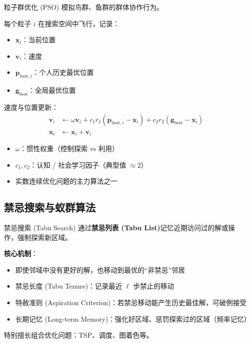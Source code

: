 \documentclass[11pt, aspectratio=169, svgnames, table, fontset=fandol]{ctexbeamer}
\begin{document}
\begin{frame}{粒子群优化 (PSO)}
  模拟鸟群、鱼群的群体协作行为。

  \vspace{4pt}
  每个粒子 $i$ 在搜索空间中飞行，记录：
  \begin{itemize}
    \item $\bm{x}_i$：当前位置
    \item $\bm{v}_i$：速度
    \item $\bm{p}_{\text{best},i}$：个人历史最优位置
    \item $\bm{g}_{\text{best}}$：全局最优位置
  \end{itemize}

  \vspace{4pt}
  速度与位置更新：
  \begin{align*}
    \bm{v}_i &\leftarrow \omega \bm{v}_i + c_1 r_1 (\bm{p}_{\text{best},i} - \bm{x}_i) + c_2 r_2 (\bm{g}_{\text{best}} - \bm{x}_i) \\
    \bm{x}_i &\leftarrow \bm{x}_i + \bm{v}_i
  \end{align*}

  \begin{itemize}
    \item $\omega$：惯性权重（控制探索 vs 利用）
    \item $c_1, c_2$：认知 / 社会学习因子（典型值 $\approx 2$）
    \item 实数连续优化问题的主力算法之一
  \end{itemize}
\end{frame}

\subsection{禁忌搜索与蚁群算法}

\begin{frame}{禁忌搜索 (Tabu Search)}
  通过\textbf{禁忌列表 (Tabu List)}记忆近期访问过的解或操作，强制探索新区域。

  \vspace{6pt}
  \textbf{核心机制}：
  \begin{itemize}
    \item 即使邻域中没有更好的解，也移动到最优的“非禁忌”邻居
    \item 禁忌长度 (Tabu Tenure)：记录最近 $\ell$ 步禁止的移动
    \item 特赦准则 (Aspiration Criterion)：若禁忌移动能产生历史最佳解，可破例接受
    \item 长期记忆 (Long-term Memory)：强化好区域、惩罚探索过的区域（频率记忆）
  \end{itemize}

  特别擅长组合优化问题：TSP、调度、图着色等。
\end{frame}
\end{document}

